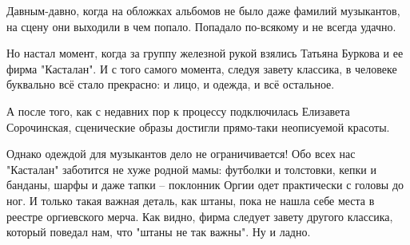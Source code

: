
Давным-давно, когда на обложках альбомов не было даже фамилий музыкантов, на сцену они выходили в чем попало. Попадало по-всякому и не всегда удачно.

Но настал момент, когда за группу железной рукой взялись Татьяна Буркова и ее фирма "Касталан". И с того самого момента, следуя завету классика, в человеке буквально всё стало прекрасно: и лицо, и одежда, и всё остальное.

А после того, как с недавних пор к процессу подключилась Елизавета Сорочинская, сценические образы достигли прямо-таки неописуемой красоты.


Однако одеждой для музыкантов дело не ограничивается! Обо всех нас "Касталан" заботится не хуже родной мамы: футболки и толстовки, кепки и банданы, шарфы и даже тапки – поклонник Оргии одет практически с головы до ног. И только такая важная деталь, как штаны, пока не нашла себе места в реестре оргиевского мерча. Как видно, фирма следует завету другого классика, который поведал нам, что "штаны не так важны". Ну и ладно.
